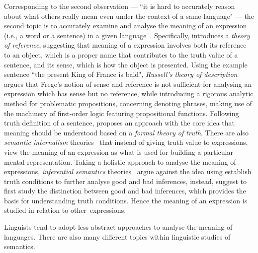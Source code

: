 Corresponding to the second observation --- ``it is hard to accurately reason about what others really mean even under the context of a same language" --- the second topic is to accurately examine and analyse the meaning of an expression (i.e., a word or a sentence) in a given language~\citep{lewis1970}. Specifically, \citet{frege1892} introduces a \emph{theory of reference}, suggesting that meaning of a expression involves both its reference to an object, which is a proper name that contributes to the truth value of a sentence, and its sense, which is how the object is presented. Using the example sentence ``the present King of France is bald", \emph{Russell's theory of description}~\citep{russell1904} argues that Frege's notion of sense and reference is not sufficient for analysing an expression which has sense but no reference, while introducing a rigorous analytic method for problematic propositions, concerning denoting phrases, making use of the machinery of first-order logic featuring propositional functions. Following  truth definition of a sentence, \citet{davidson1967} proposes an approach with the core idea that meaning should be understood based on a \emph{formal theory of truth}. There are also \emph{semantic internalism} theories~\citep{Mcgilvray1998, Chomsky2000, pietroski2017semantic} that instead of giving truth value to expressions, view the meaning of an expression as what is used for building a particular mental representation. Taking a holistic approach to analyse the meaning of expressions, \emph{inferential semantics} theories~\citep{Brandom2000} argue against the idea using establish truth conditions to further analyse good and bad inferences, instead, suggest to first study the distinction between good and bad inferences, which provides the basis for understanding truth conditions. Hence the meaning of an expression is studied in relation to other~expressions. 
\begin{center}
\vspace{-0.7em}
\vspace{-0.3em}
\end{center}

Linguists tend to adopt less abstract approaches to analyse the meaning of languages. There are also many different topics within linguistic studies of semantics.

